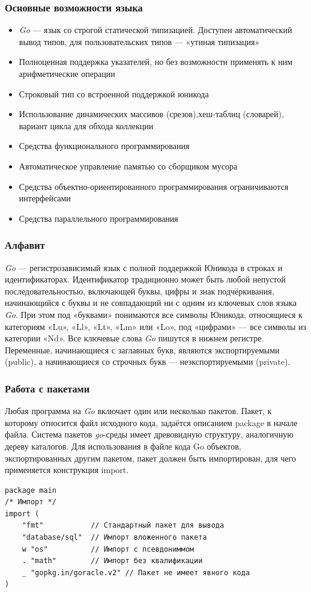 \documentclass[11pt]{beamer}
\begin{document}
\begin{frame}
\frametitle{Основные возможности языка}
\begin{itemize} 
    \item \textit{Go} — язык со строгой статической типизацией. Доступен автоматический вывод типов, для пользовательских типов — «утиная типизация»
    \item Полноценная поддержка указателей, но без возможности применять к ним арифметические операции
    \item Строковый тип со встроенной поддержкой юникода
    \item Использование динамических массивов (срезов),хеш-таблиц (словарей), вариант цикла для обхода коллекции
    \item Средства функционального программирования
    \item Автоматическое управление памятью со сборщиком мусора
    \item Средства объектно-ориентированного программирования ограничиваются интерфейсами
    \item Средства параллельного программирования
\end{itemize}
\end{frame}
\begin{frame}
\frametitle{Алфавит}
\textit{Go} — регистрозависимый язык с полной поддержкой Юникода в строках и идентификаторах.
Идентификатор традиционно может быть любой непустой последовательностью, включающей буквы, цифры и знак подчёркивания, начинающийся с буквы и не совпадающий ни с одним из ключевых слов языка \textit{Go}. При этом под «буквами» понимаются все символы Юникода, относящиеся к категориям «Lu», «Ll», «Lt», «Lm» или «Lo», под «цифрами» — все символы из категории «Nd». Все ключевые слова \textit{Go} пишутся в нижнем регистре. Переменные, начинающиеся с заглавных букв, являются экспортируемыми (public), а начинающиеся со строчных букв — неэкспортируемыми (private).
\end{frame}
\begin{frame}[fragile]
\frametitle{Работа с пакетами}
Любая программа на \textit{Go} включает один или несколько пакетов. Пакет, к которому относится файл исходного кода, задаётся описанием package в начале файла. Система пакетов \textit{go}-среды имеет древовидную структуру, аналогичную дереву каталогов. Для использования в файле кода Go объектов, экспортированных другим пакетом, пакет должен быть импортирован, для чего применяется конструкция import.
\begin{verbatim}
package main
/* Импорт */
import (
    "fmt"           // Стандартный пакет для вывода
    "database/sql"  // Импорт вложенного пакета
    w "os"          // Импорт с псевдониммом
    . "math"        // Импорт без квалификации
    _ "gopkg.in/goracle.v2" // Пакет не имеет явного кода
)
\end{verbatim}
\end{frame}
\end{document}

